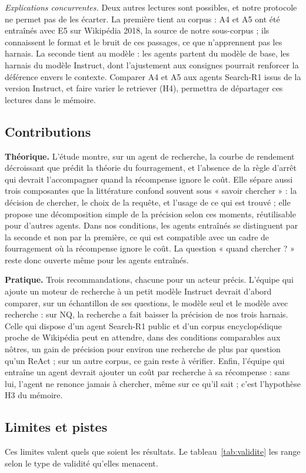 \documentclass[11pt,a4paper]{article}
\begin{document}
\emph{Explications concurrentes.} Deux autres lectures sont possibles, et notre protocole ne permet pas de les écarter. La première tient au corpus : A4 et A5 ont été entraînés avec E5 sur Wikipédia 2018, la source de notre sous-corpus ; ils connaissent le format et le bruit de ces passages, ce que n'apprennent pas les harnais. La seconde tient au modèle : les agents partent du modèle de base, les harnais du modèle Instruct, dont l'ajustement aux consignes pourrait renforcer la déférence envers le contexte. Comparer A4 et A5 aux agents Search-R1 issus de la version Instruct, et faire varier le retriever (H4), permettra de départager ces lectures dans le mémoire.

\subsection{Contributions}
\textbf{Théorique.} L'étude montre, sur un agent de recherche, la courbe de rendement décroissant que prédit la théorie du fourragement, et l'absence de la règle d'arrêt qui devrait l'accompagner quand la récompense ignore le coût. Elle sépare aussi trois composantes que la littérature confond souvent sous « savoir chercher » : la décision de chercher, le choix de la requête, et l'usage de ce qui est trouvé ; elle propose une décomposition simple de la précision selon ces moments, réutilisable pour d'autres agents. Dans nos conditions, les agents entraînés se distinguent par la seconde et non par la première, ce qui est compatible avec un cadre de fourragement où la récompense ignore le coût. La question « quand chercher ? » reste donc ouverte même pour les agents entraînés.

\textbf{Pratique.} Trois recommandations, chacune pour un acteur précis. L'équipe qui ajoute un moteur de recherche à un petit modèle Instruct devrait d'abord comparer, sur un échantillon de ses questions, le modèle seul et le modèle avec recherche : sur NQ, la recherche a fait baisser la précision de nos trois harnais. Celle qui dispose d'un agent Search-R1 public et d'un corpus encyclopédique proche de Wikipédia peut en attendre, dans des conditions comparables aux nôtres, un gain de précision pour environ une recherche de plus par question qu'un ReAct ; sur un autre corpus, ce gain reste à vérifier. Enfin, l'équipe qui entraîne un agent devrait ajouter un coût par recherche à sa récompense : sans lui, l'agent ne renonce jamais à chercher, même sur ce qu'il sait ; c'est l'hypothèse H3 du mémoire.

\subsection{Limites et pistes}
Ces limites valent quels que soient les résultats. Le tableau~\ref{tab:validite} les range selon le type de validité qu'elles menacent.
\end{document}
